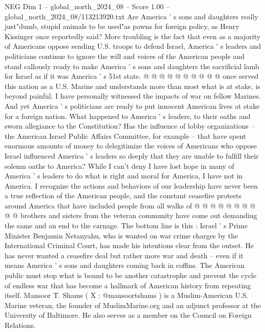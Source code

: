 \begin{textsample}{NEG Dim 1 – global\_north\_2024\_08 – Score 1.00 – global\_north\_2024\_08/113213920.txt}
Are America ' s sons and daughters really just"dumb, stupid animals to be used"as pawns for foreign policy, as Henry Kissinger once reportedly said?
More troubling is the fact that even as a majority of Americans oppose sending U.S. troops to defend Israel, America ' s leaders and politicians continue to ignore the will and voices of the American people and stand callously ready to make America ' s sons and daughters the sacrificial lamb for Israel as if it was America ' s 51st state. @ @ @ @ @ @ @ @ @ @ once served this nation as a U.S.
Marine and understands more than most what is at stake, is beyond painful.
I have personally witnessed the impacts of war on fellow Marines.
And yet America ' s politicians are ready to put innocent American lives at stake for a foreign nation.
What happened to America ' s leaders, to their oaths and sworn allegiance to the Constitution?
Has the influence of lobby organizations -- the American Israel Public Affairs Committee, for example -- that have spent enormous amounts of money to delegitimize the voices of Americans who oppose Israel influenced America ' s leaders so deeply that they are unable to fulfill their solemn oaths to America?
While I can't deny I have lost hope in many of America ' s leaders to do what is right and moral for America, I have not in America.
I recognize the actions and behaviors of our leadership have never been a true reflection of the American people, and the constant ceasefire protests around America that have included people from all walks of @ @ @ @ @ @ @ @ @ @ brothers and sisters from the veteran community have come out demanding the same and an end to the carnage.
The bottom line is this : Israel ' s Prime Minister Benjamin Netanyahu, who is wanted on war crime charges by the International Criminal Court, has made his intentions clear from the outset.
He has never wanted a ceasefire deal but rather more war and death -- even if it means America ' s sons and daughters coming back in coffins.
The American public must stop what is bound to be another catastrophe and prevent the cycle of endless war that has become a hallmark of American history from repeating itself.
Mansoor T.
Shams ( X : @mansoortshams ) is a Muslim-American U.S.
Marine veteran, the founder of MuslimMarine.org and an adjunct professor at the University of Baltimore.
He also serves as a member on the Council on Foreign Relations.

\end{textsample}
